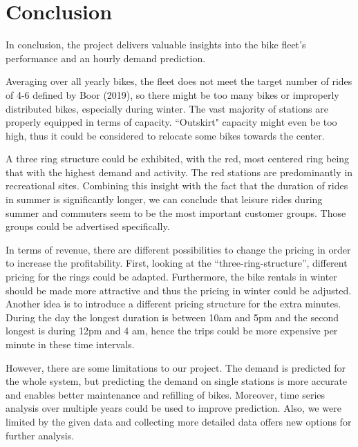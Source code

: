 
\section{Conclusion}
\label{sec:Conclusion}

In conclusion, the project delivers valuable insights into the bike fleet’s performance and an hourly demand prediction.

Averaging over all yearly bikes, the fleet does not meet the target number of rides of 4-6 defined by Boor (2019), so there might be too many bikes or improperly distributed bikes, especially during winter.  The vast majority of stations are properly equipped in terms of capacity. “Outskirt" capacity might even be too high, thus it could be considered to relocate some bikes towards the center. 

A three ring structure could be exhibited, with the red, most centered ring being that with the highest demand and activity. The red stations are predominantly  in recreational sites. Combining this insight with the fact that the duration of rides in summer is significantly longer, we can conclude that leisure rides during summer and commuters seem to be the most important customer groups. Those groups could be advertised specifically.

In terms of revenue, there are different possibilities to change the pricing in order to increase the profitability. First, looking at the “three-ring-structure”, different pricing for the rings could be adapted. Furthermore, the bike rentals in winter should be made more attractive and thus the pricing in winter could be adjusted. Another idea is to introduce a different pricing structure for the extra minutes. During the day the longest duration is between 10am and 5pm and the second longest is during 12pm and 4 am, hence the trips could be more expensive per minute in these time intervals.

However, there are some limitations to our project. The demand is predicted for the whole system, but predicting the demand on single stations is more accurate and enables better maintenance and refilling of bikes. Moreover, time series analysis over multiple years could be used to improve prediction. Also, we were limited by the given data and collecting more detailed data offers new options for further analysis.